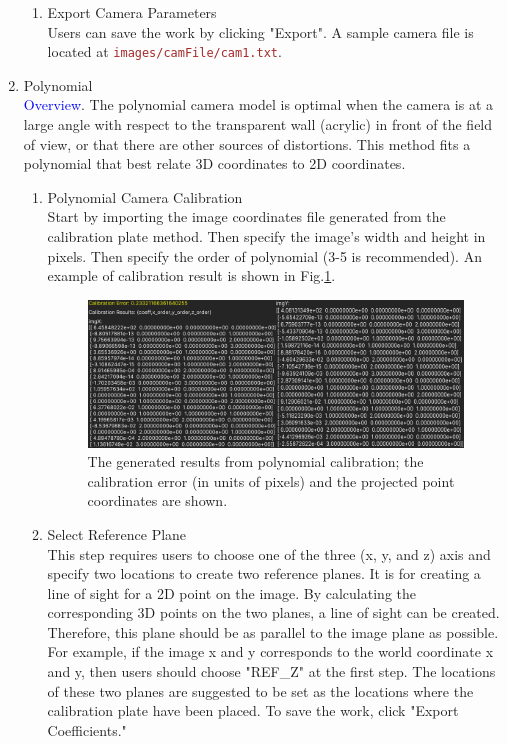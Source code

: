 \documentclass[a4paper,fleqn]{article}
\newcommand{\file}[1]{\textcolor{brown}{\texttt{#1}}}
\begin{document}
\begin{enumerate}
\begin{enumerate}
        \item Export Camera Parameters\\
        Users can save the work by clicking "Export". A sample camera file is located at \file{images/camFile/cam1.txt}.
        
    \end{enumerate}
    
    \item Polynomial\\
    \textcolor{blue}{Overview}. The polynomial camera model is optimal when the camera is at a large angle with respect to the transparent wall (acrylic) in front of the field of view, or that there are other sources of distortions. This method fits a polynomial that best relate 3D coordinates to 2D coordinates.
    
    \begin{enumerate}
        \item Polynomial Camera Calibration\\
        Start by importing the image coordinates file generated from the calibration plate method. Then specify the image's width and height in pixels. Then specify the order of polynomial (3-5 is recommended). An example of calibration result is shown in Fig.\ref{fig:GUI_poly_calib}.
        
        \begin{figure}[h]
            \centering
            \includegraphics[width=\linewidth]{Fig/GUI_poly_calib.png}
            \caption{The generated results from polynomial calibration; the calibration error (in units of pixels) and the projected point coordinates are shown.}
            \label{fig:GUI_poly_calib}
        \end{figure}

        \item Select Reference Plane\\
        This step requires users to choose one of the three (x, y, and z) axis and specify two locations to create two reference planes. It is for creating a line of sight for a 2D point on the image. By calculating the corresponding 3D points on the two planes, a line of sight can be created. Therefore, this plane should be as parallel to the image plane as possible. For example, if the image x and y corresponds to the world coordinate x and y, then users should choose "REF\_Z" at the first step. The locations of these two planes are suggested to be set as the locations where the calibration plate have been placed.
        To save the work, click "Export Coefficients."
        

\end{enumerate}
\end{enumerate}
\end{document}
